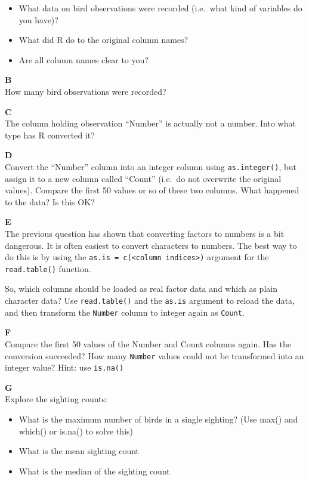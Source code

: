 \documentclass[]{book}
\providecommand{\tightlist}{%
  \setlength{\itemsep}{0pt}\setlength{\parskip}{0pt}}
\begin{document}
\begin{itemize}
\tightlist
\item
  What data on bird observations were recorded (i.e.~what kind of variables do you have)?
\item
  What did R do to the original column names?
\item
  Are all column names clear to you?
\end{itemize}

\textbf{B}\\
How many bird observations were recorded?

\textbf{C}\\
The column holding observation ``Number'' is actually not a number. Into what type has R converted it?

\textbf{D}\\
Convert the ``Number'' column into an integer column using \texttt{as.integer()}, but assign it to a new column called ``Count'' (i.e.~do not overwrite the original values). Compare the first 50 values or so of these two columns. What happened to the data? Is this OK?

\textbf{E}\\
The previous question has shown that converting factors to numbers is a bit dangerous. It is often easiest to convert characters to numbers. The best way to do this is by using the \texttt{as.is\ =\ c(\textless{}column\ indices\textgreater{})} argument for the \texttt{read.table()} function.

So, which columns should be loaded as real factor data and which as plain character data? Use \texttt{read.table()} and the \texttt{as.is} argument to reload the data, and then transform the \texttt{Number} column to integer again as \texttt{Count}.

\textbf{F}\\
Compare the first 50 values of the Number and Count columns again. Has the conversion succeeded? How many \texttt{Number} values could not be transformed into an integer value? Hint: use \texttt{is.na()}

\textbf{G}\\
Explore the sighting counts:

\begin{itemize}
\tightlist
\item
  What is the maximum number of birds in a single sighting? (Use max() and which() or is.na() to solve this)
\item
  What is the mean sighting count
\item
  What is the median of the sighting count
\end{itemize}
\end{document}
